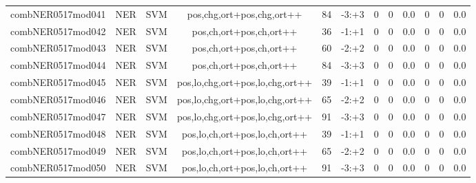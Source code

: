\documentclass[a4paper]{article}
\begin{document}
\begin{landscape}
\begin{center}
\begin{tabular}{ |c|c|c|c|c|c|c|c|c|c|c|c|}
 
 	
 	\small{ combNER0517mod041 } & \small{ NER} & \small{  SVM }  & pos,chg,ort+pos,chg,ort++  &  84 &  \small{  -3:+3 }  &  0 & 0 & 0.0  &  0 & 0 & 0.0 \\
 	

 
 	
 	\small{ combNER0517mod042 } & \small{ NER} & \small{  SVM }  & pos,ch,ort+pos,ch,ort++  &  36 &  \small{  -1:+1 }  &  0 & 0 & 0.0  &  0 & 0 & 0.0 \\
 	

 
 	
 	\small{ combNER0517mod043 } & \small{ NER} & \small{  SVM }  & pos,ch,ort+pos,ch,ort++  &  60 &  \small{  -2:+2 }  &  0 & 0 & 0.0  &  0 & 0 & 0.0 \\
 	

 
 	
 	\small{ combNER0517mod044 } & \small{ NER} & \small{  SVM }  & pos,ch,ort+pos,ch,ort++  &  84 &  \small{  -3:+3 }  &  0 & 0 & 0.0  &  0 & 0 & 0.0 \\
 	

 
 	
 	\small{ combNER0517mod045 } & \small{ NER} & \small{  SVM }  & pos,lo,chg,ort+pos,lo,chg,ort++  &  39 &  \small{  -1:+1 }  &  0 & 0 & 0.0  &  0 & 0 & 0.0 \\
 	

 
 	
 	\small{ combNER0517mod046 } & \small{ NER} & \small{  SVM }  & pos,lo,chg,ort+pos,lo,chg,ort++  &  65 &  \small{  -2:+2 }  &  0 & 0 & 0.0  &  0 & 0 & 0.0 \\
 	

 
 	
 	\small{ combNER0517mod047 } & \small{ NER} & \small{  SVM }  & pos,lo,chg,ort+pos,lo,chg,ort++  &  91 &  \small{  -3:+3 }  &  0 & 0 & 0.0  &  0 & 0 & 0.0 \\
 	

 
 	
 	\small{ combNER0517mod048 } & \small{ NER} & \small{  SVM }  & pos,lo,ch,ort+pos,lo,ch,ort++  &  39 &  \small{  -1:+1 }  &  0 & 0 & 0.0  &  0 & 0 & 0.0 \\
 	

 
 	
 	\small{ combNER0517mod049 } & \small{ NER} & \small{  SVM }  & pos,lo,ch,ort+pos,lo,ch,ort++  &  65 &  \small{  -2:+2 }  &  0 & 0 & 0.0  &  0 & 0 & 0.0 \\
 	

 
 	
 	\small{ combNER0517mod050 } & \small{ NER} & \small{  SVM }  & pos,lo,ch,ort+pos,lo,ch,ort++  &  91 &  \small{  -3:+3 }  &  0 & 0 & 0.0  &  0 & 0 & 0.0 \\
 	


\end{tabular}
\end{center}
\end{landscape}
\end{document}
